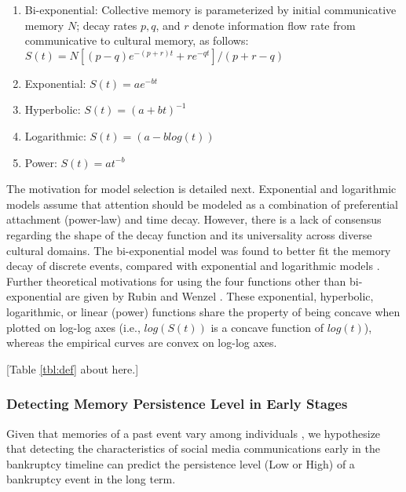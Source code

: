 \documentclass[9pt,twocolumn,twoside,lineno]{pnas-new}
\begin{document}
\begin{enumerate}

\item 
Bi-exponential: Collective memory is parameterized by initial communicative memory $N$; decay rates $p, q$, and $r$ denote information flow rate from communicative to cultural memory, as follows: $S(t) = N[(p-q)e^{-(p+r)t}+re^{-qt}]/(p+r-q)$

\item 
Exponential: $S(t) = ae^{-bt}$

\item 
Hyperbolic: $S(t) = (a+bt)^{-1}$

\item 
Logarithmic: $S(t) = (a-blog(t))$

\item 
Power: $S(t)=at^{-b}$

\end{enumerate}

The motivation for model selection is detailed next.
Exponential and logarithmic models \cite{wang2013quantifying,higham2017fame} assume that attention should be modeled as a combination of preferential attachment (power-law) and time decay.
However, there is a lack of consensus regarding the shape of the decay function and its universality across diverse cultural domains.
The bi-exponential model was found to better fit the memory decay of discrete events, compared with exponential and logarithmic models \cite{candia2019universal}.
Further theoretical motivations for using the four functions other than bi-exponential are given by Rubin and Wenzel \cite{rubin1996one}.
These exponential, hyperbolic, logarithmic, or linear (power) functions share the property of being concave when plotted on log-log axes (i.e., $log(S(t))$ is a concave function of $log(t)$), whereas the empirical curves are convex on log-log axes.

\centerline{[Table \ref{tbl:def} about here.]}


\subsubsection*{Detecting Memory Persistence Level in Early Stages}
Given that memories of a past event vary among individuals \cite{mena2016forgetting}, we hypothesize that detecting the characteristics of social media communications early in the bankruptcy timeline can predict the persistence level (Low or High) of a bankruptcy event in the long term.
\end{document}
